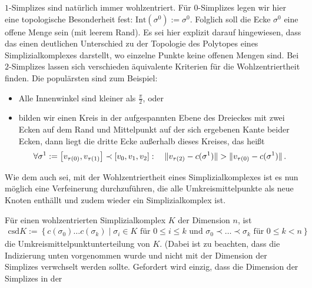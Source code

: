     \( 1 \)-Simplizes sind natürlich immer wohlzentriert. 
    Für \( 0 \)-Simplizes legen wir hier eine topologische Besonderheit fest: \(\text{Int}(\sigma^{0}) := \sigma^{0}\).
    Folglich soll die Ecke \( \sigma^{0} \) eine offene Menge sein (mit leerem Rand).
    Es sei hier explizit darauf hingewiesen, dass das einen deutlichen Unterschied zu der Topologie des Polytopes eines Simplizialkomplexes darstellt,
    wo einzelne Punkte keine offenen Mengen sind.
    Bei \( 2 \)-Simplizes lassen sich verschieden äquivalente Kriterien für die Wohlzentriertheit finden.
    Die populärsten sind zum Beispiel:
    \begin{itemize}
      \item Alle Innenwinkel sind kleiner als \( \frac{\pi}{2} \), oder
      \item bilden wir einen Kreis in der aufgespannten Ebene des Dreieckes mit zwei Ecken auf dem Rand und Mittelpunkt auf der sich ergebenen Kante beider Ecken, 
      dann liegt die dritte Ecke außerhalb dieses Kreises, das heißt
        \begin{align}
          \forall \sigma^{1} := \left[ v_{\tau(0)},v_{\tau(1)}\right] \prec \left[v_{0},v_{1},v_{2}\right]:\quad \|v_{\tau(2)} - c(\sigma^{1})\| > \|v_{\tau(0)} - c(\sigma^{1})\|
          \,\text{.}
        \end{align}
    \end{itemize}
    Wie dem auch sei, mit der Wohlzentriertheit eines Simplizialkomplexes ist es nun möglich eine Verfeinerung durchzuführen, die alle Umkreismittelpunkte als neue Knoten enthällt und zudem
    wieder ein Simplizialkomplex ist.

    \begin{definition}
      Für einen wohlzentrierten Simplizialkomplex \( K \) der Dimension \( n \), ist
      \begin{align}
        \text{csd}K := \left\{ c(\sigma_{0}) \ldots c(\sigma_{k}) \middle| \sigma_{i}\in K \text { für } 0 \le i \le k \text{ und }
                                                                          \sigma_{0} \prec \ldots \prec \sigma_{k} \text { für } 0 \le k < n \right\}
      \end{align}
      die Umkreismittelpunktunterteilung von \( K \).
      (Dabei ist zu beachten, dass die Indizierung unten vorgenommen wurde und nicht mit der Dimension der Simplizes verwchselt werden
      sollte. Gefordert wird einzig, dass die Dimension der Simplizes in der 
    \end{definition}

